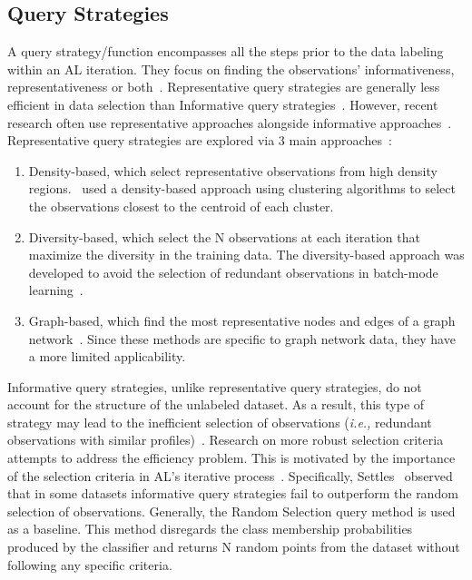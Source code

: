 \documentclass[preprint, 12pt]{elsarticle}
\begin{document}
\subsection{Query Strategies}

A query strategy/function encompasses all the steps prior to the data labeling
within an AL iteration. They focus on finding the observations'
informativeness, representativeness or both~\cite{Gu2021, Kumar2020}.
Representative query strategies are generally less efficient in data selection
than Informative query strategies~\cite{Kumar2020}. However, recent research
often use representative approaches alongside informative
approaches~\cite{Gu2021, Samat2016}. Representative query strategies are
explored via 3 main approaches~\cite{Kumar2020}: 

\begin{enumerate}
    \item Density-based, which select representative observations from high
        density regions.~\cite{Huang2014, Li2012, Ienco2013} used a
        density-based approach using clustering algorithms to select the
        observations closest to the centroid of each cluster. 
    \item Diversity-based, which select the N observations at each iteration
        that maximize the diversity in the training data. The diversity-based
        approach was developed to avoid the selection of redundant
        observations in batch-mode learning~\cite{Brinker2003}.
    \item Graph-based, which find the most representative nodes and edges of a
        graph network~\cite{Jia2019}. Since these methods are specific to
        graph network data, they have a more limited applicability.
\end{enumerate}

Informative query strategies, unlike representative query strategies, do not
account for the structure of the unlabeled dataset. As a result, this type of
strategy may lead to the inefficient selection of observations (\textit{i.e.,}
redundant observations with similar profiles)~\cite{Kumar2020}. Research on
more robust selection criteria attempts to address the efficiency problem.
This is motivated by the importance of the selection criteria in AL's
iterative process~\cite{Rosario2020}. Specifically, Settles~\cite{Settles2011}
observed that in some datasets informative query strategies fail to outperform
the random selection of observations. Generally, the Random Selection query
method is used as a baseline. This method disregards the class membership
probabilities produced by the classifier and returns N random points from the
dataset without following any specific criteria.
\end{document}
